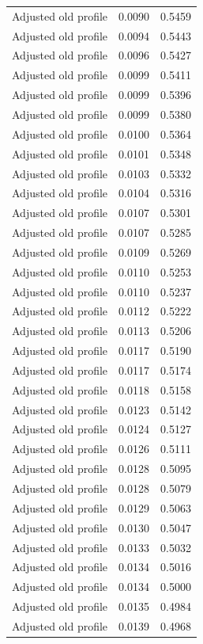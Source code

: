 \begin{table}[htbp]
\begin{tabular}{lll}
Adjusted old profile & 0.0090 & 0.5459 \\
Adjusted old profile & 0.0094 & 0.5443 \\
Adjusted old profile & 0.0096 & 0.5427 \\
Adjusted old profile & 0.0099 & 0.5411 \\
Adjusted old profile & 0.0099 & 0.5396 \\
Adjusted old profile & 0.0099 & 0.5380 \\
Adjusted old profile & 0.0100 & 0.5364 \\
Adjusted old profile & 0.0101 & 0.5348 \\
Adjusted old profile & 0.0103 & 0.5332 \\
Adjusted old profile & 0.0104 & 0.5316 \\
Adjusted old profile & 0.0107 & 0.5301 \\
Adjusted old profile & 0.0107 & 0.5285 \\
Adjusted old profile & 0.0109 & 0.5269 \\
Adjusted old profile & 0.0110 & 0.5253 \\
Adjusted old profile & 0.0110 & 0.5237 \\
Adjusted old profile & 0.0112 & 0.5222 \\
Adjusted old profile & 0.0113 & 0.5206 \\
Adjusted old profile & 0.0117 & 0.5190 \\
Adjusted old profile & 0.0117 & 0.5174 \\
Adjusted old profile & 0.0118 & 0.5158 \\
Adjusted old profile & 0.0123 & 0.5142 \\
Adjusted old profile & 0.0124 & 0.5127 \\
Adjusted old profile & 0.0126 & 0.5111 \\
Adjusted old profile & 0.0128 & 0.5095 \\
Adjusted old profile & 0.0128 & 0.5079 \\
Adjusted old profile & 0.0129 & 0.5063 \\
Adjusted old profile & 0.0130 & 0.5047 \\
Adjusted old profile & 0.0133 & 0.5032 \\
Adjusted old profile & 0.0134 & 0.5016 \\
Adjusted old profile & 0.0134 & 0.5000 \\
Adjusted old profile & 0.0135 & 0.4984 \\
Adjusted old profile & 0.0139 & 0.4968 \\

\end{tabular}
\end{table}
